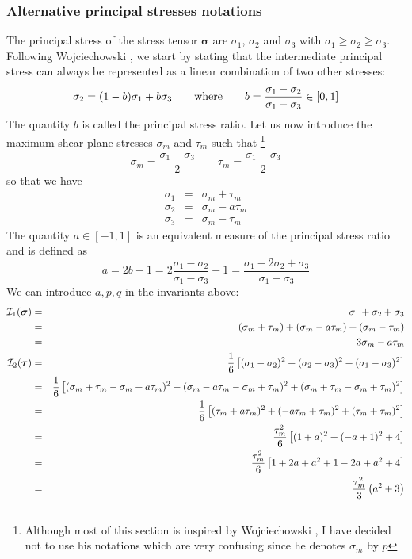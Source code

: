 \subsubsection{Alternative principal stresses notations}\label{sec:altinv}

The principal stress of the stress tensor ${\bm \sigma}$ are $\sigma_1$, $\sigma_2$
and $\sigma_3$ with $\sigma_1 \geq \sigma_2 \geq \sigma_3$.
Following Wojciechowski \cite{wojc18}, we start by stating that the intermediate principal 
stress can always be represented as a linear combination of two other stresses:
\begin{equation}
\sigma_2 = (1-b)\sigma_1 + b \sigma_3
\qquad
{\rm where}
\qquad
b = \frac{\sigma_1-\sigma_2}{\sigma_1-\sigma_3}\in [0,1]
\end{equation}
The quantity $b$ is called the principal stress ratio. 
Let us now introduce the maximum shear plane stresses $\sigma_m$ and $\tau_m$ such that
\footnote{Although most of this section is inspired by Wojciechowski \cite{wojc18}, 
I have decided not to use his notations which are very confusing since he denotes $\sigma_m$ by $p$} 
\begin{equation}
\boxed{\sigma_m=\frac{\sigma_1+\sigma_3}{2}}
\qquad
\boxed{\tau_m=\frac{\sigma_1-\sigma_3}{2}}
\end{equation}
so that we have 
\begin{eqnarray}
\sigma_1 &=& \sigma_m+\tau_m \\
\sigma_2 &=& \sigma_m-a\tau_m \\ 
\sigma_3 &=& \sigma_m-\tau_m
\end{eqnarray}
The quantity $a\in[-1,1]$ is an equivalent measure of the principal stress ratio and 
is defined as 
\begin{equation}
a=2b-1 =2 \frac{\sigma_1-\sigma_2}{\sigma_1-\sigma_3}-1=\frac{\sigma_1-2\sigma_2+\sigma_3}{\sigma_1-\sigma_3}
\end{equation}
We can introduce $a,p,q$ in the invariants above:
\begin{eqnarray}
{\cal I}_1({\bm \sigma}) 
&=& \sigma_1 + \sigma_2 + \sigma_3 \nonumber\\
&=& (\sigma_m+\tau_m) + (\sigma_m-a\tau_m) + (\sigma_m-\tau_m) \nonumber\\
&=& 3\sigma_m -a\tau_m \\
{\cal I}_2({\bm \tau}) 
&=&\frac{1}{6}\left[(\sigma_{1}-\sigma_{2})^2 +(\sigma_{2}-\sigma_{3})^2 +(\sigma_{1}-\sigma_{3})^2\right]\nonumber\\ 
&=&\frac{1}{6}\left[(\sigma_m+\tau_m-\sigma_m+a\tau_m)^2 +(\sigma_m-a\tau_m-\sigma_m+\tau_m)^2 
+(\sigma_m+\tau_m-\sigma_m+\tau_m)^2\right]\nonumber\\ 
&=&\frac{1}{6}\left[(\tau_m+a\tau_m)^2 +(-a\tau_m+\tau_m)^2 +(\tau_m+\tau_m)^2\right]\nonumber\\ 
&=&\frac{\tau_m^2}{6}\left[(1+a)^2 +(-a+1)^2 + 4 \right]\nonumber\\ 
&=&\frac{\tau_m^2}{6}\left[ 1+2a+a^2 +1 - 2a+a^2 + 4 \right]\nonumber\\ 
&=&\frac{\tau_m^2}{3}\left( a^2 +3 \right)
\end{eqnarray}
